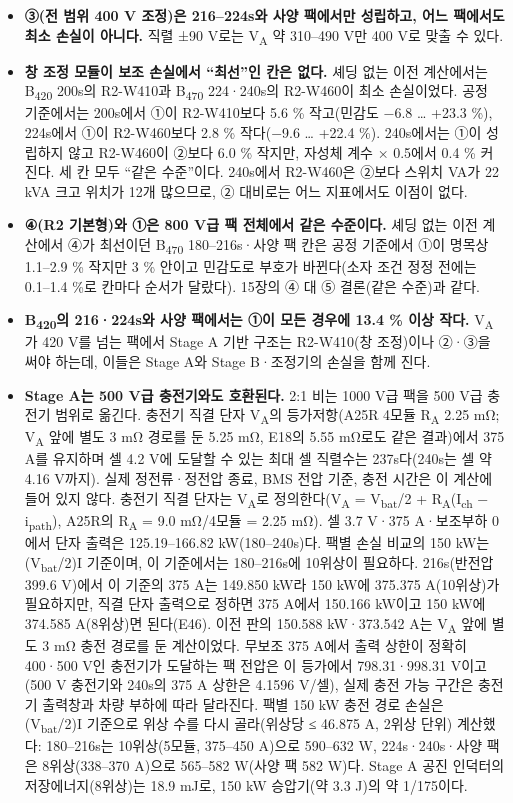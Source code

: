 \begin{itemize}
\item \textbf{③(전 범위 400 V 조정)은 216–224s와 사양 팩에서만 성립하고, 어느 팩에서도 최소 손실이 아니다.} 직렬 ±90 V로는 V\textsubscript{A} 약 310–490 V만 400 V로 맞출 수 있다.
\item \textbf{창 조정 모듈이 보조 손실에서 “최선”인 칸은 없다.} 셰딩 없는 이전 계산에서는 B\textsubscript{420} 200s의 R2-W410과 B\textsubscript{470} 224·240s의 R2-W460이 최소 손실이었다. 공정 기준에서는 200s에서 ①이 R2-W410보다 5.6 \% 작고(민감도 −6.8 … +23.3 \%), 224s에서 ①이 R2-W460보다 2.8 \% 작다(−9.6 … +22.4 \%). 240s에서는 ①이 성립하지 않고 R2-W460이 ②보다 6.0 \% 작지만, 자성체 계수 × 0.5에서 0.4 \% 커진다. 세 칸 모두 “같은 수준”이다. 240s에서 R2-W460은 ②보다 스위치 VA가 22 kVA 크고 위치가 12개 많으므로, ② 대비로는 어느 지표에서도 이점이 없다.
\item \textbf{④(R2 기본형)와 ①은 800 V급 팩 전체에서 같은 수준이다.} 셰딩 없는 이전 계산에서 ④가 최선이던 B\textsubscript{470} 180–216s·사양 팩 칸은 공정 기준에서 ①이 명목상 1.1–2.9 \% 작지만 3 \% 안이고 민감도로 부호가 바뀐다(소자 조건 정정 전에는 0.1–1.4 \%로 칸마다 순서가 달랐다). 15장의 ④ 대 ⑤ 결론(같은 수준)과 같다.
\item \textbf{B\textsubscript{420}의 216·224s와 사양 팩에서는 ①이 모든 경우에 13.4 \% 이상 작다.} V\textsubscript{A}가 420 V를 넘는 팩에서 Stage A 기반 구조는 R2-W410(창 조정)이나 ②·③을 써야 하는데, 이들은 Stage A와 Stage B·조정기의 손실을 함께 진다.
\item \textbf{Stage A는 500 V급 충전기와도 호환된다.} 2:1 비는 1000 V급 팩을 500 V급 충전기 범위로 옮긴다. 충전기 직결 단자 V\textsubscript{A}의 등가저항(A25R 4모듈 R\textsubscript{A} 2.25 mΩ; V\textsubscript{A} 앞에 별도 3 mΩ 경로를 둔 5.25 mΩ, E18의 5.55 mΩ로도 같은 결과)에서 375 A를 유지하며 셀 4.2 V에 도달할 수 있는 최대 셀 직렬수는 237s다(240s는 셀 약 4.16 V까지). 실제 정전류·정전압 종료, BMS 전압 기준, 충전 시간은 이 계산에 들어 있지 않다. 충전기 직결 단자는 V\textsubscript{A}로 정의한다(V\textsubscript{A} = V\textsubscript{bat}/2 + R\textsubscript{A}(I\textsubscript{ch} − i\textsubscript{path}), A25R의 R\textsubscript{A} = 9.0 mΩ/4모듈 = 2.25 mΩ). 셀 3.7 V·375 A·보조부하 0에서 단자 출력은 125.19–166.82 kW(180–240s)다. 팩별 손실 비교의 150 kW는 (V\textsubscript{bat}/2)I 기준이며, 이 기준에서는 180–216s에 10위상이 필요하다. 216s(반전압 399.6 V)에서 이 기준의 375 A는 149.850 kW라 150 kW에 375.375 A(10위상)가 필요하지만, 직결 단자 출력으로 정하면 375 A에서 150.166 kW이고 150 kW에 374.585 A(8위상)면 된다(E46). 이전 판의 150.588 kW·373.542 A는 V\textsubscript{A} 앞에 별도 3 mΩ 충전 경로를 둔 계산이었다. 무보조 375 A에서 출력 상한이 정확히 400·500 V인 충전기가 도달하는 팩 전압은 이 등가에서 798.31·998.31 V이고(500 V 충전기와 240s의 375 A 상한은 4.1596 V/셀), 실제 충전 가능 구간은 충전기 출력창과 차량 부하에 따라 달라진다. 팩별 150 kW 충전 경로 손실은 (V\textsubscript{bat}/2)I 기준으로 위상 수를 다시 골라(위상당 ≤ 46.875 A, 2위상 단위) 계산했다: 180–216s는 10위상(5모듈, 375–450 A)으로 590–632 W, 224s·240s·사양 팩은 8위상(338–370 A)으로 565–582 W(사양 팩 582 W)다. Stage A 공진 인덕터의 저장에너지(8위상)는 18.9 mJ로, 150 kW 승압기(약 3.3 J)의 약 1/175이다.
\end{itemize}

